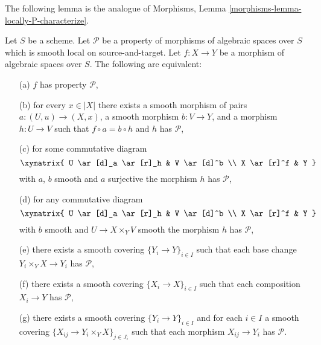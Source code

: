 \noindent
The following lemma is the analogue of
Morphisms, Lemma \ref{morphisms-lemma-locally-P-characterize}.

\begin{lemma}
\label{lemma-local-source-target-characterize}
Let $S$ be a scheme.
Let $\mathcal{P}$ be a property of morphisms of algebraic spaces over $S$
which is smooth local on source-and-target. Let $f : X \to Y$ be a morphism
of algebraic spaces over $S$. The following are equivalent:
\begin{enumerate}
\item[(a)] $f$ has property $\mathcal{P}$,
\item[(b)] for every $x \in |X|$ there exists a smooth morphism of pairs
$a : (U, u) \to (X, x)$, a smooth morphism $b : V \to Y$, and
a morphism $h : U \to V$ such that $f \circ a = b \circ h$ and
$h$ has $\mathcal{P}$,
\item[(c)] for some commutative diagram
$$
\xymatrix{
U \ar[d]_a \ar[r]_h & V \ar[d]^b \\
X \ar[r]^f & Y
}
$$
with $a$, $b$ smooth and $a$ surjective the morphism $h$ has $\mathcal{P}$,
\item[(d)] for any commutative diagram
$$
\xymatrix{
U \ar[d]_a \ar[r]_h & V \ar[d]^b \\
X \ar[r]^f & Y
}
$$
with $b$ smooth and $U \to X \times_Y V$ smooth
the morphism $h$ has $\mathcal{P}$,
\item[(e)] there exists a smooth covering $\{Y_i \to Y\}_{i \in I}$ such
that each base change $Y_i \times_Y X \to Y_i$ has $\mathcal{P}$,
\item[(f)] there exists a smooth covering $\{X_i \to X\}_{i \in I}$ such
that each composition $X_i \to Y$ has $\mathcal{P}$,
\item[(g)] there exists a smooth covering $\{Y_i \to Y\}_{i \in I}$ and
for each $i \in I$ a smooth covering
$\{X_{ij} \to Y_i \times_Y X\}_{j \in J_i}$ such that each morphism
$X_{ij} \to Y_i$ has $\mathcal{P}$.
\end{enumerate}
\end{lemma}

